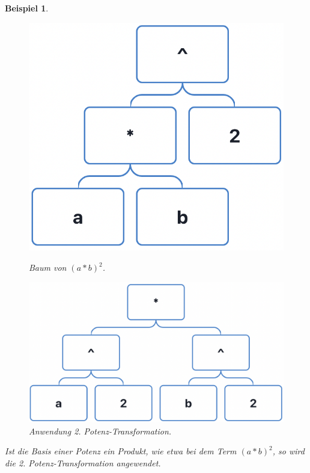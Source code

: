 \documentclass[11pt]{article}
\newtheorem{example}{Beispiel}
\begin{document}
\begin{example}
  \begin{figure}[h]
    \begin{minipage}{.5\textwidth}
      \centering
      \includegraphics[scale=0.4]{trees/power/beispiel_3_1.png}
      \caption{Baum von ${(a*b)^2}$.}
    \end{minipage}
    \begin{minipage}{.5\textwidth}
      \centering
      \includegraphics[scale=0.4]{trees/power/beispiel_3_2.png}
      \caption{Anwendung 2. Potenz-Transformation.}
    \end{minipage}
  \end{figure}
  Ist die Basis einer Potenz ein Produkt, wie etwa bei dem Term ${{(a*b)}^2}$, so wird die 2.
  Potenz-Transformation angewendet.
\end{example}
\end{document}
